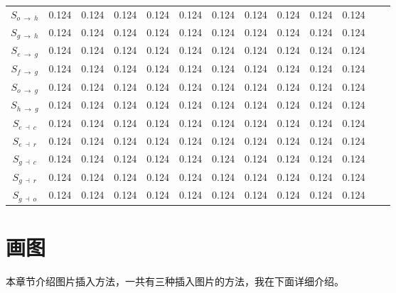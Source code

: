 \begin{ThreePartTable}
\begin{longtable}{c l *{10}{c} c}
        $S_{o \: \rightarrow \: h}$ & 0.124 &  0.124 &  0.124 &  0.124 &  0.124 &  0.124 &  0.124 &  0.124 &  0.124 &  0.124 \\
        
        $S_{g \: \rightarrow \: h}$ & 0.124 &  0.124 &  0.124 &  0.124 &  0.124 &  0.124 &  0.124 &  0.124 &  0.124 &  0.124 \\
        
        $S_{e \: \rightarrow \: g}$ & 0.124 &  0.124 &  0.124 &  0.124 &  0.124 &  0.124 &  0.124 &  0.124 &  0.124 &  0.124 \\
        
        $S_{f \: \rightarrow \: g}$ & 0.124 &  0.124 &  0.124 &  0.124 &  0.124 &  0.124 &  0.124 &  0.124 &  0.124 &  0.124 \\
        
        $S_{o \: \rightarrow \: g}$ & 0.124 &  0.124 &  0.124 &  0.124 &  0.124 &  0.124 &  0.124 &  0.124 &  0.124 &  0.124 \\
        
        $S_{h \: \rightarrow \: g}$ & 0.124 &  0.124 &  0.124 &  0.124 &  0.124 &  0.124 &  0.124 &  0.124 &  0.124 &  0.124 \\
        
        $S_{e \: \dashv \: c}$ & 0.124 &  0.124 &  0.124 &  0.124 &  0.124 &  0.124 &  0.124 &  0.124 &  0.124 &  0.124 \\
        
        $S_{e \: \dashv \: r}$ & 0.124 &  0.124 &  0.124 &  0.124 &  0.124 &  0.124 &  0.124 &  0.124 &  0.124 &  0.124 \\
        
        $S_{g \: \dashv \: c}$ & 0.124 &  0.124 &  0.124 &  0.124 &  0.124 &  0.124 &  0.124 &  0.124 &  0.124 &  0.124 \\
        
        $S_{g \: \dashv \: r}$ & 0.124 &  0.124 &  0.124 &  0.124 &  0.124 &  0.124 &  0.124 &  0.124 &  0.124 &  0.124 \\
        
        $S_{g \: \dashv \: o}$ & 0.124 &  0.124 &  0.124 &  0.124 &  0.124 &  0.124 &  0.124 &  0.124 &  0.124 &  0.124 \\
    \end{longtable}
\end{ThreePartTable}

\section{画图}
本章节介绍图片插入方法，一共有三种插入图片的方法，我在下面详细介绍。
